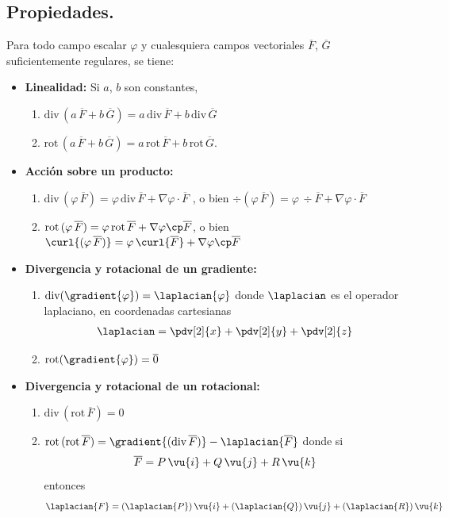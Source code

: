 \subsection{Propiedades.}
Para todo campo escalar $\varphi$ y cualesquiera campos vectoriales $\overline{F}$, $\overline{G}$ suficientemente regulares, se tiene:
\begin{itemize}
\item \textbf{Linealidad:} Si $a$, $b$ son constantes,
\begin{enumerate}[label=(\roman*)]
\item  $\text{div} \, (a \, \overline{F} + b \, \overline{G}) = a \, \text{div} \, \overline{F} + b \, \text{div} \, \overline{G}$
\item $\text{rot} \, (a \, \overline{F} + b \, \overline{G}) = a \, \text{rot} \, \overline{F} + b \, \text{rot}  \, \overline{G}.$
\end{enumerate}
\item \textbf{Acción sobre un producto:}
\begin{enumerate}[label=(\roman*)]
\item  $\text{div} \, (\varphi \, \overline{F}) = \varphi \,  \text{div} \, \overline{F} + \nabla \varphi \cdot \overline{F}$ , o bien $\div{(\varphi \, \overline{F} )} = \varphi \, \div{\overline{F}} +  \nabla \varphi \cdot \overline{F}$
\item $\text{rot} \, (\varphi \, \overline{F}) = \varphi \, \text{rot} \, \overline{F} + \nabla \varphi \cp \overline{F}$, o bien $\curl{(\varphi \, \overline{F})} = \varphi \, \curl{\overline{F}} + \nabla \varphi \cp \overline{F}$
\end{enumerate}
\item \textbf{Divergencia y rotacional de un gradiente:}
\begin{enumerate}[label=(\roman*)]
\item $\text{div} (\gradient{\varphi}) = \laplacian{\varphi}$ donde $\laplacian$ es el operador laplaciano, en coordenadas cartesianas
\begin{align*}
\laplacian = \pdv[2]{x} + \pdv[2]{y} + \pdv[2]{z} 
\end{align*}
\item $\text{rot} (\gradient{\varphi}) = \overline{0}$
\end{enumerate}
\item \textbf{Divergencia y rotacional de un rotacional:}
\begin{enumerate}[label=(\roman*)]
\item $\text{div} \, (\text{rot} \, \overline{F}) = 0$
\item $\text{rot} \, (\text{rot} \, \overline{F}) = \gradient{(\text{div} \, \overline{F})} - \laplacian{\overline{F}}$ donde si
\begin{align*}
\overline{F} = P \, \vu{i} + Q \, \vu{j} + R \, \vu{k}
\end{align*}
entonces
\begin{align*}
\laplacian{F} = (\laplacian{P}) \, \vu{i} + (\laplacian{Q}) \, \vu{j} + (\laplacian{R}) \, \vu{k}
\end{align*}
\end{enumerate}
\end{itemize}
